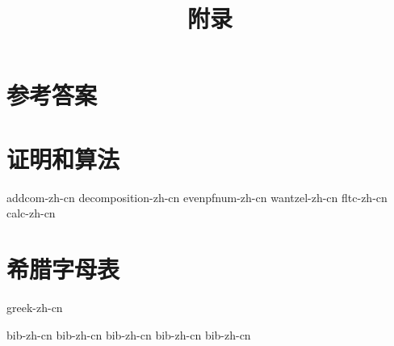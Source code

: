 \documentclass[b5paper]{ctexart}
\begin{document}
\title{附录}

\maketitle
\fi

\chapter{参考答案}
\label{ch:answers}
\shipoutAnswer

\chapter{证明和算法}

{addcom-zh-cn}
{decomposition-zh-cn}
{evenpfnum-zh-cn}
{wantzel-zh-cn}
{fltc-zh-cn}
{calc-zh-cn}

\chapter{希腊字母表} \label{ch:greek-letters}
{greek-zh-cn}

\markboth{\bibname}{}

\begin{thebibliography}{99}
  {bib-zh-cn}
  {bib-zh-cn}
  {bib-zh-cn}
  {bib-zh-cn}
  {bib-zh-cn}
\end{thebibliography}

\ifx\wholebook\relax \else
\expandafter\enddocument
\fi
\end{document}
